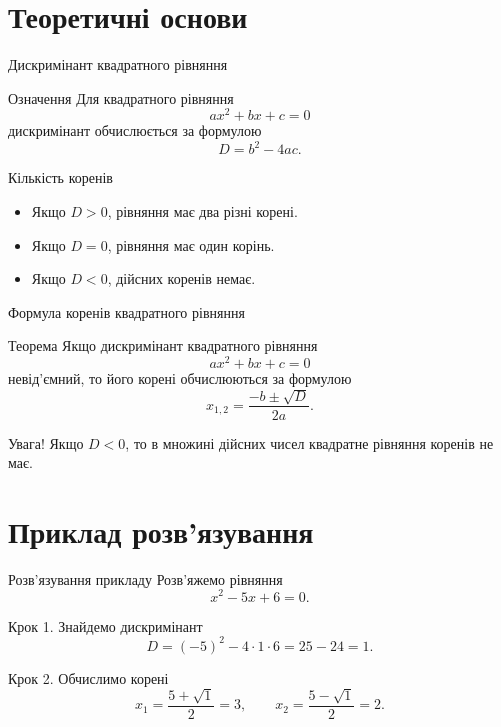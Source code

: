 \documentclass{beamer}
\begin{document}
\section{Теоретичні основи}
\begin{frame}{Дискримінант квадратного рівняння}
    \begin{block}{Означення}
        Для квадратного рівняння
        \[
        ax^2 + bx + c = 0
        \]
        дискримінант обчислюється за формулою
        \[
        D = b^2 - 4ac.
        \]
    \end{block}

    \begin{exampleblock}{Кількість коренів}
        \begin{itemize}
            \item Якщо $D > 0$, рівняння має два різні корені.
            \item Якщо $D = 0$, рівняння має один корінь.
            \item Якщо $D < 0$, дійсних коренів немає.
        \end{itemize}
    \end{exampleblock}
\end{frame}
\begin{frame}{Формула коренів квадратного рівняння}
    \begin{block}{Теорема}
        Якщо дискримінант квадратного рівняння
        \[
        ax^2 + bx + c = 0
        \]
        невід’ємний, то його корені обчислюються за формулою
        \[
        x_{1,2} = \frac{-b \pm \sqrt{D}}{2a}.
        \]
    \end{block}

    \begin{alertblock}{Увага!}
        Якщо $D < 0$, то в множині дійсних чисел квадратне рівняння коренів не має.
    \end{alertblock}
\end{frame}

\section{Приклад розв’язування}
\begin{frame}{Розв’язування прикладу}
    Розв’яжемо рівняння
    \[
    x^2 - 5x + 6 = 0.
    \]

    \begin{exampleblock}{Крок 1. Знайдемо дискримінант}
        \[
        D = (-5)^2 - 4 \cdot 1 \cdot 6 = 25 - 24 = 1.
        \]
    \end{exampleblock}

    \begin{exampleblock}{Крок 2. Обчислимо корені}
        \[
        x_1 = \frac{5 + \sqrt{1}}{2} = 3,
        \qquad
        x_2 = \frac{5 - \sqrt{1}}{2} = 2.
        \]
    \end{exampleblock}
\end{frame}
\end{document}
